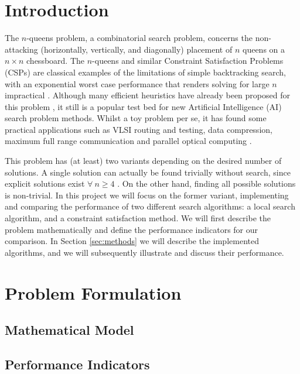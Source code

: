 \section{Introduction}

The $n$-queens problem, a combinatorial search problem, concerns the non-attacking (horizontally, vertically, and diagonally) placement of $n$ queens on a $n\times n$ chessboard. The $n$-queens and similar Constraint Satisfaction Problems (CSPs) are classical examples of the limitations of simple backtracking search, with an exponential worst case performance that renders solving for large $n$ impractical \citep{sosic90, backtracking}. Although many efficient heuristics have already been proposed for this problem \citep{sosic91, hu03, aima, engel07, agarwal12}, it still is a popular test bed for new Artificial Intelligence (AI) search problem methods. Whilst a toy problem per se, it has found some practical applications such as VLSI routing and testing, data compression, maximum full range communication and parallel optical computing \citep{sosic91, hu03}.

This problem has (at least) two variants depending on the desired number of solutions. A single solution can actually be found trivially without search, since explicit solutions exist $\forall \ n \ge 4$ \citep{trivial}. On the other hand, finding all possible solutions is non-trivial. In this project we will focus on the former variant, implementing and comparing the performance of two different search algorithms: a local search algorithm, and a constraint satisfaction method. We will first describe the problem mathematically and define the performance indicators for our comparison. In Section \ref{sec:methods} we will describe the implemented algorithms, and we will subsequently illustrate and discuss their performance.

\section{Problem Formulation}

\subsection{Mathematical Model}



\subsection{Performance Indicators}


